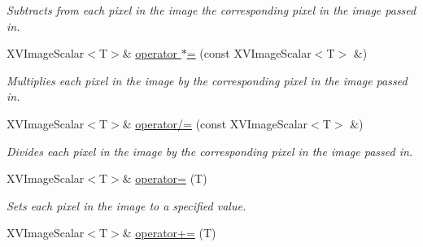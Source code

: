 \begin{CompactItemize}
\begin{CompactList}\small\item\em Subtracts from each pixel in the image the corresponding pixel in the image passed in.\item\end{CompactList}\item 
\label{XVImageScalar_a19}
\hypertarget{class_XVImageScalar_a19}{
XVImage\-Scalar$<$T$>$\& \hyperlink{class_XVImageScalar_a19}{operator $\ast$=} (const XVImage\-Scalar$<$T$>$ \&)}

\begin{CompactList}\small\item\em Multiplies each pixel in the image by the corresponding pixel in the image passed in.\item\end{CompactList}\item 
\label{XVImageScalar_a20}
\hypertarget{class_XVImageScalar_a20}{
XVImage\-Scalar$<$T$>$\& \hyperlink{class_XVImageScalar_a20}{operator/=} (const XVImage\-Scalar$<$T$>$ \&)}

\begin{CompactList}\small\item\em Divides each pixel in the image by the corresponding pixel in the image passed in.\item\end{CompactList}\item 
\label{XVImageScalar_a21}
\hypertarget{class_XVImageScalar_a21}{
XVImage\-Scalar$<$T$>$\& \hyperlink{class_XVImageScalar_a21}{operator=} (T)}

\begin{CompactList}\small\item\em Sets each pixel in the image to a specified value.\item\end{CompactList}\item 
\label{XVImageScalar_a22}
\hypertarget{class_XVImageScalar_a22}{
XVImage\-Scalar$<$T$>$\& \hyperlink{class_XVImageScalar_a22}{operator+=} (T)}


\end{CompactItemize}
